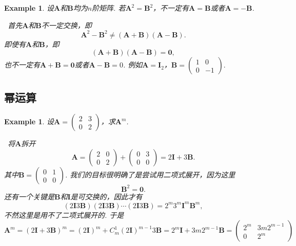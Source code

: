 \documentclass{article}
\newtheorem{example}[theorem]{Example}
\newcommand{\hints}{{\color{blue} \text{hints}}}
\newcommand{\mbf}[1]{\bm{#1}}
\begin{document}
\begin{example}
\rm 设$\mbf{A}$和$\mbf{B}$均为$n$阶矩阵. 若$\mbf{A}^2 = \mbf{B}^2$，不一定有$\mbf{A} = \mbf{B}$或者$\mbf{A} = -\mbf{B}$.

\hints\ 首先$\mbf{A}$和$\mbf{B}$不一定交换，即
$$
\mbf{A}^2 - \mbf{B}^2 \neq (\mbf{A} + \mbf{B})(\mbf{A} - \mbf{B}).
$$
即使有$\mbf{A}$和$\mbf{B}$，即
$$
(\mbf{A} + \mbf{B})(\mbf{A} - \mbf{B}) = \mbf{0},
$$
也不一定有$\mbf{A} + \mbf{B} = \mbf{0}$或者$\mbf{A} - \mbf{B} = 0$. 例如$\mbf{A} = \mbf{I}_2$，$\mbf{B} = \begin{pmatrix}
1 & 0 \\
0 & -1
\end{pmatrix}.$
\end{example}

\subsection{幂运算}


\begin{example}
\rm 设$\mbf{A} = \begin{pmatrix}
2 & 3 \\
0 & 2
\end{pmatrix}$，求$\mbf{A}^m$. 

\hints\ 将$\mbf{A}$拆开
$$
\mbf{A} = \begin{pmatrix}
2 & 0 \\
0 & 2 
\end{pmatrix} + \begin{pmatrix}
0 & 3 \\
0 & 0
\end{pmatrix} = 2\mbf{I} + 3\mbf{B}.
$$
其中$\mbf{B}= \begin{pmatrix}
0 & 1 \\
0 & 0
\end{pmatrix}$. 我们的目标很明确了是尝试用二项式展开，因为这里
$$
\mbf{B}^2 = \mbf{0}. 
$$
还有一个关键是$\mbf{B}$和$\mbf{I}$是可交换的，因此才有
$$
(2\mbf{I}3\mbf{B})(2\mbf{I}3\mbf{B})\cdots(2\mbf{I}3\mbf{B}) = 2^m3^m \mbf{I}^m \mbf{B}^m,
$$ 
不然这里是用不了二项式展开的. 于是
$$
\mbf{A}^m = (2\mbf{I} + 3\mbf{B})^m = (2\mbf{I})^m + C_m^1 (2\mbf{I})^{m-1}3\mbf{B} = 2^m \mbf{I} + 3m 2^{m-1}\mbf{B} = \begin{pmatrix}
2^m & 3m2^{m-1} \\
0 & 2^m 
\end{pmatrix}
$$
\end{example}
\end{document}
